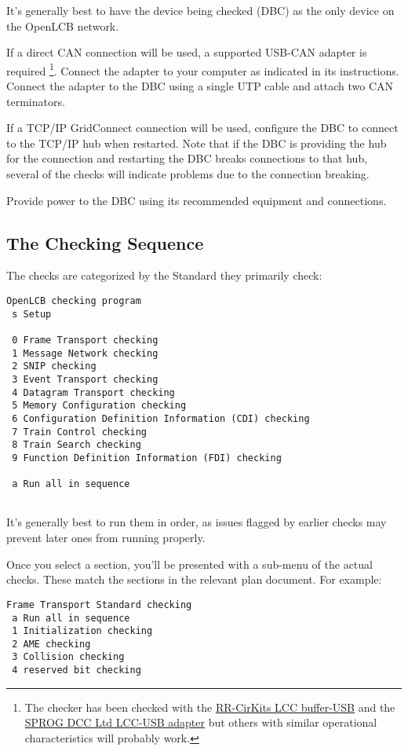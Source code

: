 It's generally best to have the device being checked (DBC)
as the only device on the OpenLCB network.

If a direct CAN connection will be used,
a supported USB-CAN adapter is required
\footnote{The checker has been checked with the
\href{https://www.rr-cirkits.com/description/LCC-usb-flyer.pdf}{RR-CirKits LCC buffer-USB}
and the \href{https://www.sprog-dcc.co.uk/lcc-start-page}{SPROG DCC Ltd LCC-USB adapter}
but others with similar operational characteristics will probably work.
}.
Connect the adapter to your computer as indicated in its instructions.
Connect the adapter to the DBC using a single UTP cable
and attach two CAN terminators.

If a TCP/IP GridConnect connection will be used,
configure the DBC to connect to the TCP/IP hub when restarted. Note that if
the DBC is providing the hub for the connection and restarting the DBC
breaks connections to that hub, several of the checks will indicate problems
due to the connection breaking.

Provide power to the DBC using its recommended equipment and connections.

\subsection{The Checking Sequence}

The checks are categorized by the Standard they primarily check:

\begin{verbatim}
OpenLCB checking program
 s Setup

 0 Frame Transport checking
 1 Message Network checking
 2 SNIP checking
 3 Event Transport checking
 4 Datagram Transport checking
 5 Memory Configuration checking
 6 Configuration Definition Information (CDI) checking
 7 Train Control checking
 8 Train Search checking
 9 Function Definition Information (FDI) checking
  
 a Run all in sequence
 
\end{verbatim}

It's generally best to run them in order, as issues flagged by earlier
checks may prevent later ones from running properly.

Once you select a section, you'll be presented with a sub-menu of the
actual checks.  These match the sections in the relevant plan document.
For example:

\begin{verbatim}
Frame Transport Standard checking
 a Run all in sequence
 1 Initialization checking
 2 AME checking
 3 Collision checking
 4 reserved bit checking
\end{verbatim}

